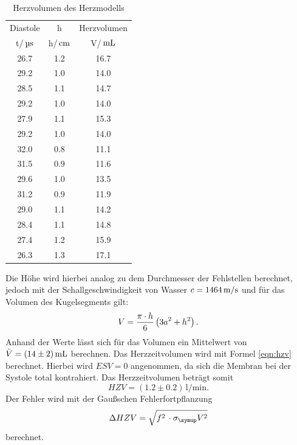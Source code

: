 \begin{table}[H]
  \centering
  \begin{tabular}{ccc}
    \toprule
    \multicolumn{1}{c}{Diastole}&\multicolumn{1}{c}{h}&\multicolumn{1}{c}{Herzvolumen}\\
    t/$\,\si{\micro\second}$ & h/$\,\si{\centi\meter}$ & V/$\,\si{\milli\litre}$ \\
    \midrule
    26.7 & 1.2  &  16.7 \\
    29.2 & 1.0  &  14.0 \\
    28.5 & 1.1  &  14.7 \\
    29.2 & 1.0  &  14.0 \\
    27.9 & 1.1  &  15.3 \\
    29.2 & 1.0  &  14.0 \\
    32.0 & 0.8  &  11.1 \\
    31.5 & 0.9  &  11.6 \\
    29.6 & 1.0  &  13.5 \\
    31.2 & 0.9  &  11.9 \\
    29.0 & 1.1  &  14.2 \\
    28.4 & 1.1  &  14.8 \\
    27.4 & 1.2  &  15.9 \\
    26.3 & 1.3  &  17.1 \\
    \bottomrule
  \end{tabular}
  \caption{Herzvolumen des Herzmodells}
  \label{tab:dia}
\end{table}
Die Höhe wird hierbei analog zu dem Durchmesser der Fehlstellen berechnet, jedoch
mit der Schallgeschwindigkeit von Wasser $c=1464\,\si{\meter\per\second}$\cite{olympus} und
für das Volumen des Kugelsegments gilt:
\begin{equation*}
  V=\frac{\pi\cdot h}{6}\left(3a^2+h^2\right).
\end{equation*}
Anhand der Werte lässt sich für das Volumen ein Mittelwert von $\bar V=(14\pm2)\,\si{\milli\litre}$
berechnen.
Das Herzzeitvolumen wird mit Formel \eqref{eqn:hzv} berechnet. Hierbei wird
$ESV=0$ angenommen, da sich die Membran bei der Systole total kontrahiert.
Das Herzzeitvolumen beträgt somit
\begin{equation*}
  HZV = (1.2 \pm 0.2 )\,\si{\litre\per\minute}.
\end{equation*}
Der Fehler wird mit der Gaußschen Fehlerfortpflanzung
\begin{equation*}
  \Delta HZV = \sqrt{f^2\,\cdot\sigma_\su{V}^2}
\end{equation*}
berechnet.
